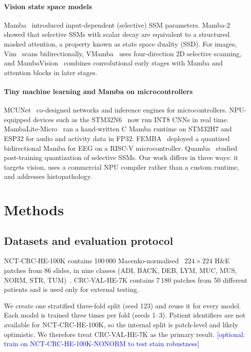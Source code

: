 \documentclass[preprint,12pt]{elsarticle}
\newcommand{\todo}[1]{\textcolor{blue}{[#1]}}
\begin{document}
\paragraph{Vision state space models}
Mamba~\cite{gu2023mamba} introduced input-dependent (selective) SSM parameters. Mamba-2~\cite{dao2024ssd} showed that selective SSMs with scalar decay are equivalent to a structured masked attention, a property known as state space duality (SSD). For images, Vim~\cite{zhu2024vim} scans bidirectionally, VMamba~\cite{liu2024vmamba} uses four-direction 2D selective scanning, and MambaVision~\cite{hatamizadeh2025mambavision} combines convolutional early stages with Mamba and attention blocks in later stages.

\paragraph{Tiny machine learning and Mamba on microcontrollers}
MCUNet~\cite{lin2020mcunet} co-designed networks and inference engines for microcontrollers. NPU-equipped devices such as the STM32N6~\cite{st2024stm32n6} now run INT8 CNNs in real time. MambaLite-Micro~\cite{xu2025mambalite} ran a hand-written C Mamba runtime on STM32H7 and ESP32 for audio and activity data in FP32. FEMBA~\cite{tegon2026femba} deployed a quantized bidirectional Mamba for EEG on a RISC-V microcontroller. Quamba~\cite{chiang2025quamba} studied post-training quantization of selective SSMs. Our work differs in three ways: it targets vision, uses a commercial NPU compiler rather than a custom runtime, and addresses histopathology.

\section{Methods}
\subsection{Datasets and evaluation protocol}
NCT-CRC-HE-100K contains 100\,000 Macenko-normalised~\cite{macenko2009} $224\times224$ H\&E patches from 86 slides, in nine classes (ADI, BACK, DEB, LYM, MUC, MUS, NORM, STR, TUM)~\cite{kather2019}. CRC-VAL-HE-7K contains 7\,180 patches from 50 different patients and is used only for external testing.

We create one stratified three-fold split (seed 123) and reuse it for every model. Each model is trained three times per fold (seeds 1--3). Patient identifiers are not available for NCT-CRC-HE-100K, so the internal split is patch-level and likely optimistic. We therefore treat CRC-VAL-HE-7K as the primary result. \todo{optional: train on NCT-CRC-HE-100K-NONORM to test stain robustness}
\end{document}

